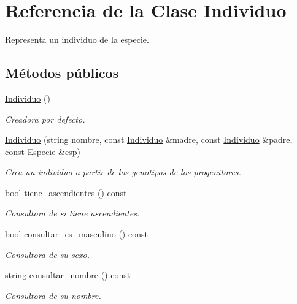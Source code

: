 \hypertarget{class_individuo}{}\section{Referencia de la Clase Individuo}
\label{class_individuo}


Representa un individuo de la especie.  


\subsection*{Métodos públicos}
\begin{DoxyCompactItemize}
\item 
\hyperlink{class_individuo_a3042a660b9789ee24dd3658248c8e0b9}{Individuo} ()
\begin{DoxyCompactList}\small\item\em Creadora por defecto. \end{DoxyCompactList}\item 
\hyperlink{class_individuo_aa4e303d7179a1ad0f0f2986d093d830a}{Individuo} (string nombre, const \hyperlink{class_individuo}{Individuo} \&madre, const \hyperlink{class_individuo}{Individuo} \&padre, const \hyperlink{class_especie}{Especie} \&esp)
\begin{DoxyCompactList}\small\item\em Crea un individuo a partir de los genotipos de los progenitores. \end{DoxyCompactList}\item 
bool \hyperlink{class_individuo_ac30b51c4b8268e4e2cd0f3ac77f20b07}{tiene\+\_\+ascendientes} () const 
\begin{DoxyCompactList}\small\item\em Consultora de si tiene ascendientes. \end{DoxyCompactList}\item 
bool \hyperlink{class_individuo_a40c32d5439ebad9b120c582bf172d116}{consultar\+\_\+es\+\_\+masculino} () const 
\begin{DoxyCompactList}\small\item\em Consultora de su sexo. \end{DoxyCompactList}\item 
string \hyperlink{class_individuo_a0256784d237c97bdbd515bebc1d75574}{consultar\+\_\+nombre} () const 
\begin{DoxyCompactList}\small\item\em Consultora de su nombre. \end{DoxyCompactList}\item 

\end{DoxyCompactItemize}
